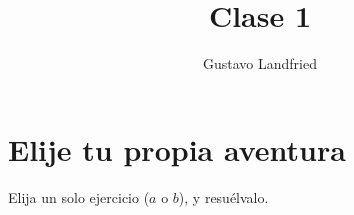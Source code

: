 \documentclass[a4paper,10pt]{article}
\title{Clase 1}
\author{Gustavo Landfried}
\begin{document}
\maketitle
% 


\section*{Elije tu propia aventura}

Elija un solo ejercicio ($a$ o $b$), y resu\'elvalo.
\end{document}
